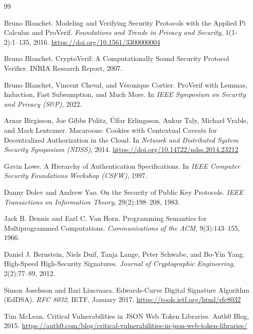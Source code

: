 \documentclass[11pt,a4paper]{article}
\theoremstyle{definition}
\begin{document}
\begin{thebibliography}{99}

Bruno Blanchet.
\newblock Modeling and Verifying Security Protocols with the Applied Pi Calculus and ProVerif.
\newblock \textit{Foundations and Trends in Privacy and Security}, 1(1-2):1--135, 2016.
\newblock \url{https://doi.org/10.1561/3300000004}

Bruno Blanchet.
\newblock CryptoVerif: A Computationally Sound Security Protocol Verifier.
\newblock INRIA Research Report, 2007.

Bruno Blanchet, Vincent Cheval, and Véronique Cortier.
\newblock ProVerif with Lemmas, Induction, Fast Subsumption, and Much More.
\newblock In \textit{IEEE Symposium on Security and Privacy (S\&P)}, 2022.

Arnar Birgisson, Joe Gibbs Politz, Úlfar Erlingsson, Ankur Taly, Michael Vrable, and Mark Lentczner.
\newblock Macaroons: Cookies with Contextual Caveats for Decentralized Authorization in the Cloud.
\newblock In \textit{Network and Distributed System Security Symposium (NDSS)}, 2014.
\newblock \url{https://doi.org/10.14722/ndss.2014.23212}

Gavin Lowe.
\newblock A Hierarchy of Authentication Specifications.
\newblock In \textit{IEEE Computer Security Foundations Workshop (CSFW)}, 1997.

Danny Dolev and Andrew Yao.
\newblock On the Security of Public Key Protocols.
\newblock \textit{IEEE Transactions on Information Theory}, 29(2):198--208, 1983.

Jack B. Dennis and Earl C. Van Horn.
\newblock Programming Semantics for Multiprogrammed Computations.
\newblock \textit{Communications of the ACM}, 9(3):143--155, 1966.

Daniel J. Bernstein, Niels Duif, Tanja Lange, Peter Schwabe, and Bo-Yin Yang.
\newblock High-Speed High-Security Signatures.
\newblock \textit{Journal of Cryptographic Engineering}, 2(2):77--89, 2012.

Simon Josefsson and Ilari Liusvaara.
\newblock Edwards-Curve Digital Signature Algorithm (EdDSA).
\newblock \textit{RFC 8032}, IETF, January 2017.
\newblock \url{https://tools.ietf.org/html/rfc8032}

Tim McLean.
\newblock Critical Vulnerabilities in JSON Web Token Libraries.
\newblock Auth0 Blog, 2015.
\newblock \url{https://auth0.com/blog/critical-vulnerabilities-in-json-web-token-libraries/}


\end{thebibliography}
\end{document}
